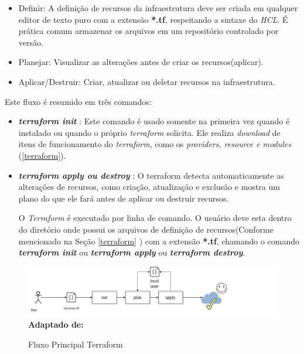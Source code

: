 \begin{itemize}
  \item Definir: A definição de recursos da infraestrutura deve ser criada em qualquer editor de texto puro com a extensão \textbf{*.tf}, respeitando a sintaxe do \textit{HCL}. É prática comum armazenar os arquivos em um repositório controlado por versão.
   \item Planejar: Visualizar as alterações antes de criar os recursos(aplicar).
   \item Aplicar/Destruir: Criar, atualizar ou deletar recursos na infraestrutura. 
\end{itemize}


Este fluxo é resumido em três comandos: 


\begin{itemize}

\item \textbf{\textit{terraform init }}: Este comando é usado somente na primeira vez quando é instalado ou quando o próprio \textit{terraform} solicita. Ele realiza \textit{download} de itens de funcionamento do \textit{terraform}, como os \textit{providers, resource e modules} (\ref{terraform}). 

\item \textbf{\textit{terraform apply ou destroy }}: O terraform  detecta automaticamente as alterações de recursos, como criação, atualização e exclusão e mostra um plano do que ele fará antes de aplicar ou destruir recursos.

O \textit{Terraform} é executado por linha de comando. O usuário deve esta dentro do diretório onde possui os arquivos de definição de recursos(Conforme mencionado na Seção \ref{terraform} )  com a extensão \textbf{*.tf}, chamando o comando \textbf{\textit{terraform init}} ou \textbf{\textit{terraform apply}} ou \textbf{\textit{terraform destroy}}.  


\end{itemize}

\begin{figure}[ht]
	\centering	
	\caption[\hspace{0.1cm}Fluxo Principal Terraform]{Fluxo Principal Terraform}
	\vspace{-0.4cm}
	\includegraphics[width=1.2\textwidth]{artigo/figuras/terraform_single_workflow.png}
	 \vspace{-0.2cm}
	\\\textbf{\footnotesize Adaptado de: \cite{Turbinskii}}
	\label{fig:figura7}
\end{figure}
\vspace{-0.5cm}

